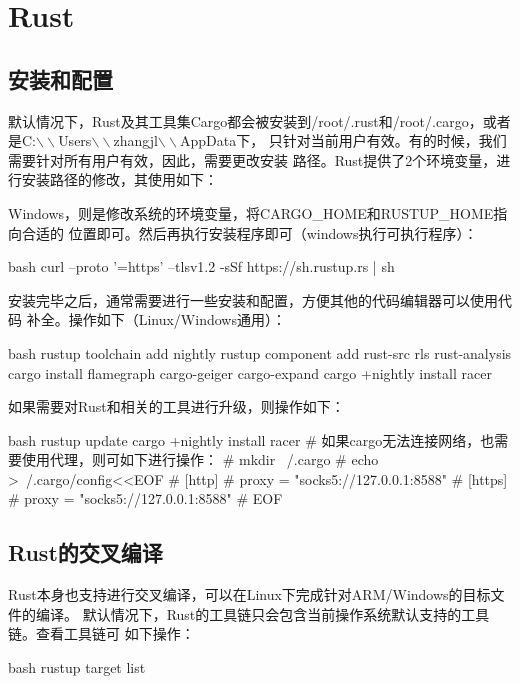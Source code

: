 \chapter{Rust}

\section{安装和配置}
默认情况下，Rust及其工具集Cargo都会被安装到/root/.rust和/root/.cargo，或者
是C:$\backslash\backslash$Users$\backslash\backslash$zhangjl$\backslash\backslash$AppData下，
只针对当前用户有效。有的时候，我们需要针对所有用户有效，因此，需要更改安装
路径。Rust提供了2个环境变量，进行安装路径的修改，其使用如下：

Windows，则是修改系统的环境变量，将CARGO\_HOME和RUSTUP\_HOME指向合适的
位置即可。然后再执行安装程序即可（windows执行可执行程序）：
\begin{code-block}{bash}
curl --proto '=https' --tlsv1.2 -sSf https://sh.rustup.rs | sh
\end{code-block}

安装完毕之后，通常需要进行一些安装和配置，方便其他的代码编辑器可以使用代码
补全。操作如下（Linux/Windows通用）：
\begin{code-block}{bash}
rustup toolchain add nightly
rustup component add rust-src rls rust-analysis
cargo install flamegraph cargo-geiger cargo-expand
cargo +nightly install racer
\end{code-block}

如果需要对Rust和相关的工具进行升级，则操作如下：
\begin{code-block}{bash}
rustup update
cargo +nightly install racer
# 如果cargo无法连接网络，也需要使用代理，则可如下进行操作：
# mkdir ~/.cargo
# echo >~/.cargo/config<<EOF
# [http]
# proxy = "socks5://127.0.0.1:8588"
# [https]
# proxy = "socks5://127.0.0.1:8588"
# EOF
\end{code-block}

\section{Rust的交叉编译}
Rust本身也支持进行交叉编译，可以在Linux下完成针对ARM/Windows的目标文件的编译。
默认情况下，Rust的工具链只会包含当前操作系统默认支持的工具链。查看工具链可
如下操作：
\begin{code-block}{bash}
rustup target list
\end{code-block}

